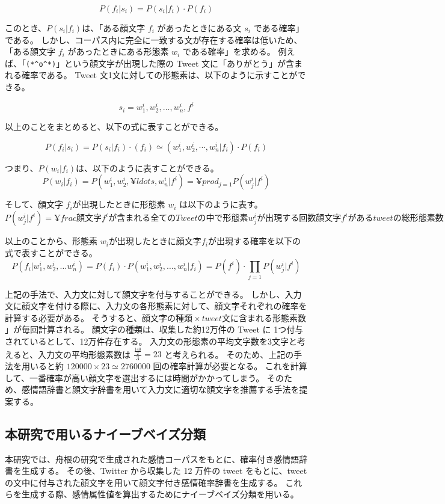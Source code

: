 \documentclass[11pt,a4j]{jsarticle}
\begin{document}
\[
  P(f_i|s_i)=P(s_i|f_i) \cdot P(f_i)
\]

このとき、$P(s_i|f_i)$は、「ある顔文字 $f_i$ があったときにある文 $s_i$ である確率」である。
しかし、コーパス内に完全に一致する文が存在する確率は低いため、「ある顔文字 $f_i$ があったときにある形態素 $w_i$ である確率」を求める。
例えば、「\verb|(*^o^*)|」という顔文字が出現した際の Tweet 文に「ありがとう」が含まれる確率である。
Tweet 文1文に対しての形態素は、以下のように示すことができる。

\[
s_i = w_1^i,w_2^i,\ldots,w_n^i,f^i
\]


以上のことをまとめると、以下の式に表すことができる。

\[
  P(f_i|s_i)=P(s_i|f_i) \cdot (f_i) \simeq (w^i_1,w^i_2, \cdots,w^i_n|f_i)\cdot P(f_i)
\]

つまり、$P(w_i|f_i)$は、以下のように表すことができる。
\[
P(w_i|f_i) = P(w^i_1,w^i_2,¥ldots,w^i_n|f^i) = ¥prod_{j=1} P(w^i_j|f^i)
\]

そして、顔文字 $f_i$が出現したときに形態素 $w_i$ は以下のように表す。
\[
P(w^i_j|f^i) = ¥frac{顔文字 f^i が含まれる全てのTweetの中で形態素 w^i_j が出現する回数}{顔文字 f^i があるtweetの総形態素数}
\]

以上のことから、形態素 $w_i$が出現したときに顔文字$f_i$が出現する確率を以下の式で表すことができる。
\[
  P(f_i|w^i_1,w^i_2, \dots w^i_n) = P(f_i) \cdot P(w^i_1,w^i_2, \dots ,w^i_n|f_i) = P(f^i) \cdot \prod_{j=1} P(w^i_j|f^i)
\]

上記の手法で、入力文に対して顔文字を付与することができる。
しかし、入力文に顔文字を付ける際に、入力文の各形態素に対して、顔文字それぞれの確率を計算する必要がある。
そうすると、$顔文字の種類 \times \mathit{tweet}文に含まれる形態素数$」が毎回計算される。
顔文字の種類は、収集した約12万件の Tweet に 1つ付与されているとして、12万件存在する。
入力文の形態素の平均文字数を3文字と考えると、入力文の平均形態素数は $\frac{\frac{140}{2}}{3}=23$ と考えられる。
そのため、上記の手法を用いると約 $120000 \times 23 \simeq 2760000$ 回の確率計算が必要となる。
これを計算して、一番確率が高い顔文字を選出するには時間がかかってしまう。
そのため、感情語辞書と顔文字辞書を用いて入力文に適切な顔文字を推薦する手法を提案する。

  \subsection{本研究で用いるナイーブベイズ分類}\label{sec:thesisnaivebayes}
本研究では、舟根の研究で生成された感情コーパスをもとに、確率付き感情語辞書を生成する。
その後、Twitter から収集した 12 万件の tweet をもとに、tweet の文中に付与された顔文字を用いて顔文字付き感情確率辞書を生成する。
これらを生成する際、感情属性値を算出するためにナイーブベイズ分類を用いる。
\end{document}
